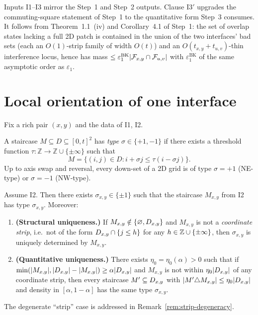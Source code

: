 \begin{remark}
Inputs \textsc{I1}--\textsc{I3} mirror the Step~1 and Step~2 outputs.
Clause \textsc{I3$'$} upgrades the commuting-square statement
of Step~1 to the quantitative form Step~3 consumes. It follows from
Theorem~1.1~(iv) and Corollary~4.1 of Step~1: the set of
overlap states lacking a full 2D patch is contained in the union of the two
interfaces' bad sets (each an $O(1)$-strip family of width $O(t)$) and an
$O(t_{x,y}+t_{u,v})$-thin interference locus, hence has mass
$\le \varepsilon_1^{\mathrm{BK}}|\mathcal{F}_{x,y}\cap\mathcal{F}_{u,v}|$ with
$\varepsilon_1^{\mathrm{BK}}$ of the same asymptotic order as $\varepsilon_1$.
\end{remark}

\section{Local orientation of one interface}\label{sec:local-orientation}

Fix a rich pair $(x,y)$ and the data of \textsc{I1}, \textsc{I2}.

\begin{definition}\label{def:staircase-type}
A staircase $M\subseteq D\subseteq[0,t]^2$ has \emph{type} $\sigma\in\{+1,-1\}$ if
there exists a threshold function $\tau\colon\mathbb{Z}\to\mathbb{Z}\cup\{\pm\infty\}$
such that
\[
  M = \bigl\{(i,j)\in D : i+\sigma j \le \tau(i-\sigma j)\bigr\}.
\]
Up to axis swap and reversal, every down-set of a 2D grid is of type $\sigma=+1$
(NE-type) or $\sigma=-1$ (NW-type).
\end{definition}

\begin{lemma}\label{lem:local-sign}
Assume \textsc{I2}. Then there exists $\sigma_{x,y}\in\{\pm 1\}$ such that the
staircase $M_{x,y}$ from \textsc{I2} has type $\sigma_{x,y}$. Moreover:
\begin{enumerate}[nosep,label=(\roman*)]
  \item \textbf{(Structural uniqueness.)} If $M_{x,y}\notin\{\varnothing,D_{x,y}\}$
  and $M_{x,y}$ is not a \emph{coordinate strip}, i.e.\ not of the form
  $D_{x,y}\cap\{j\le h\}$ for any $h\in\mathbb{Z}\cup\{\pm\infty\}$, then $\sigma_{x,y}$
  is uniquely determined by $M_{x,y}$.
  \item \textbf{(Quantitative uniqueness.)} There exists
  $\eta_0=\eta_0(\alpha)>0$ such that if
  $\min(|M_{x,y}|,|D_{x,y}|-|M_{x,y}|)\ge \alpha|D_{x,y}|$ and $M_{x,y}$ is not within
  $\eta_0|D_{x,y}|$ of any coordinate strip, then every staircase
  $M'\subseteq D_{x,y}$ with $|M'\triangle M_{x,y}|\le \eta_0|D_{x,y}|$ and density in
  $[\alpha,1-\alpha]$ has the same type $\sigma_{x,y}$.
\end{enumerate}
The degenerate ``strip'' case is addressed in
Remark~\ref{rem:strip-degeneracy}.
\end{lemma}

